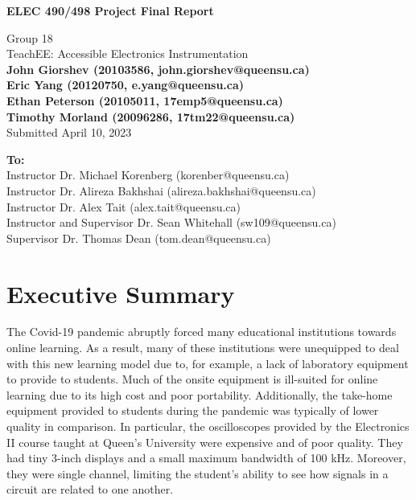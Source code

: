 \documentclass[letterpaper,11pt]{article}
\begin{document}
\begin{titlepage}
    \begin{center}
        \vspace*{1cm}

        \Large
        \textbf{ELEC 490/498 Project Final Report}

        \vspace{0.5cm}
        Group 18\\
        TeachEE: Accessible Electronics Instrumentation\\
        \vspace{0.5cm}
        \normalsize
        \textbf{John Giorshev (20103586, john.giorshev@queensu.ca) \\ Eric Yang (20120750, e.yang@queensu.ca) \\ Ethan Peterson (20105011, 17emp5@queensu.ca) \\ Timothy Morland (20096286, 17tm22@queensu.ca)}\\
        \vspace{0.5cm}
        Submitted April 10, 2023\\

        \vfill
            
        \textbf{To:}\\
        Instructor Dr. Michael Korenberg (korenber@queensu.ca) \\
        Instructor Dr. Alireza Bakhshai (alireza.bakhshai@queensu.ca) \\
        Instructor Dr. Alex Tait (alex.tait@queensu.ca) \\
        Instructor and Supervisor Dr. Sean Whitehall (sw109@queensu.ca) \\
        Supervisor Dr. Thomas Dean (tom.dean@queensu.ca) \\
            
        \vspace{1.8cm}

    \end{center}
\end{titlepage}
\section*{Executive Summary}
The Covid-19 pandemic abruptly forced many educational institutions towards online
learning. As a result, many of these institutions were unequipped to deal with this
new learning model due to, for example, a lack of laboratory equipment to provide
to students. Much of the onsite equipment is ill-suited for online learning due to
its high cost and poor portability. Additionally, the take-home equipment provided
to students during the pandemic was typically of lower quality in comparison. In
particular, the oscilloscopes provided by the Electronics II course taught at Queen's
University were expensive and of poor quality. They had tiny 3-inch displays and a
small maximum bandwidth of 100 kHz. Moreover, they were single channel, limiting the
student's ability to see how signals in a circuit are related to one another.
\end{document}
